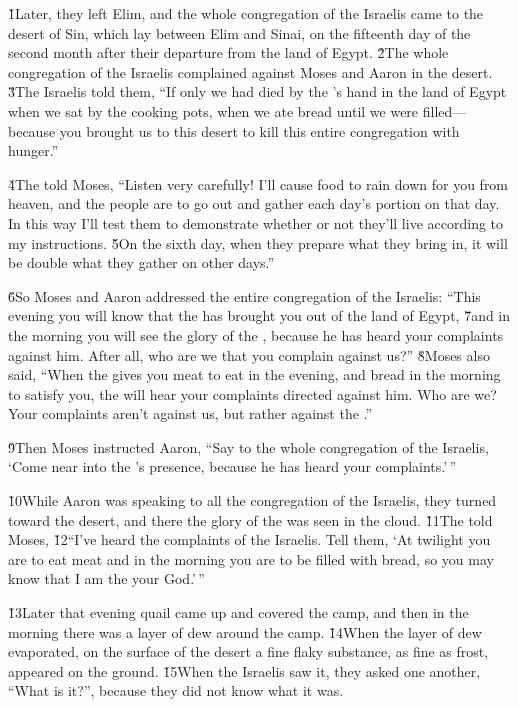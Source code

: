 \v{1}Later, they left Elim, and the whole congregation of the Israelis came to the desert of Sin, which lay between Elim and Sinai, on the fifteenth day of the second month after their departure from the land of Egypt. \v{2}The whole congregation of the Israelis complained against Moses and Aaron in the desert. \v{3}The Israelis told them, ``If only we had died by the 's hand in the land of Egypt when we sat by the cooking pots, when we ate bread until we were filled---because you brought us to this desert to kill this entire congregation with hunger.''

\v{4}The  told Moses, ``Listen very carefully! I'll cause food to rain down for you from heaven, and the people are to go out and gather each day's portion on that day. In this way I'll test them to demonstrate whether or not they'll live according to my instructions. \v{5}On the sixth day, when they prepare what they bring in, it will be double what they gather on other days.''

\v{6}So Moses and Aaron addressed the entire congregation of the Israelis: ``This evening you will know that the  has brought you out of the land of Egypt, \v{7}and in the morning you will see the glory of the , because he has heard your complaints against him. After all, who are we that you complain against us?'' \v{8}Moses also said, ``When the  gives you meat to eat in the evening, and bread in the morning to satisfy you, the  will hear your complaints directed against him. Who are we? Your complaints aren't against us, but rather against the .''

\v{9}Then Moses instructed Aaron, ``Say to the whole congregation of the Israelis, `Come near into the 's presence, because he has heard your complaints.'\,''

\v{10}While Aaron was speaking to all the congregation of the Israelis, they turned toward the desert, and there the glory of the  was seen in the cloud. \v{11}The  told Moses, \v{12}``I've heard the complaints of the Israelis. Tell them, `At twilight you are to eat meat and in the morning you are to be filled with bread, so you may know that I am the  your God.'\,''

\v{13}Later that evening quail came up and covered the camp, and then in the morning there was a layer of dew around the camp. \v{14}When the layer of dew evaporated, on the surface of the desert a fine flaky substance, as fine as frost, appeared on the ground. \v{15}When the Israelis saw it, they asked one another, ``What is it?'', because they did not know what it was.

